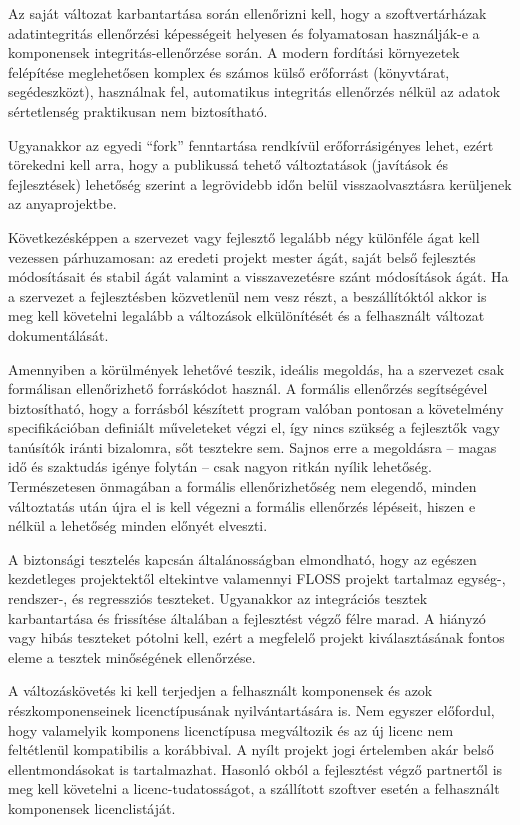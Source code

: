 \documentclass[12pt,magyar,a4paper,oneside]{scrreprt}
\begin{document}
Az saját változat karbantartása során ellenőrizni kell, hogy a
szoftvertárházak adatintegritás ellenőrzési képességeit helyesen és
folyamatosan használják-e a komponensek integritás-ellenőrzése során. A
modern fordítási környezetek felépítése meglehetősen komplex és számos
külső erőforrást (könyvtárat, segédeszközt), használnak fel, automatikus
integritás ellenőrzés nélkül az adatok sértetlenség praktikusan nem
biztosítható.

Ugyanakkor az egyedi ``fork'' fenntartása rendkívül erőforrásigényes
lehet, ezért törekedni kell arra, hogy a publikussá tehető változtatások
(javítások és fejlesztések) lehetőség szerint a legrövidebb időn belül
visszaolvasztásra kerüljenek az anyaprojektbe.

Következésképpen a szervezet vagy fejlesztő legalább négy különféle ágat
kell vezessen párhuzamosan: az eredeti projekt mester ágát, saját belső
fejlesztés módosításait és stabil ágát valamint a visszavezetésre szánt
módosítások ágát. Ha a szervezet a fejlesztésben közvetlenül nem vesz
részt, a beszállítóktól akkor is meg kell követelni legalább a
változások elkülönítését és a felhasznált változat dokumentálását.

Amennyiben a körülmények lehetővé teszik, ideális megoldás, ha a
szervezet csak formálisan ellenőrizhető forráskódot használ. A formális
ellenőrzés segítségével biztosítható, hogy a forrásból készített program
valóban pontosan a követelmény specifikációban definiált műveleteket
végzi el, így nincs szükség a fejlesztők vagy tanúsítók iránti
bizalomra, sőt tesztekre sem. Sajnos erre a megoldásra -- magas idő és
szaktudás igénye folytán -- csak nagyon ritkán nyílik lehetőség.
Természetesen önmagában a formális ellenőrizhetőség nem elegendő, minden
változtatás után újra el is kell végezni a formális ellenőrzés lépéseit,
hiszen e nélkül a lehetőség minden előnyét elveszti.

A biztonsági tesztelés kapcsán általánosságban elmondható, hogy az
egészen kezdetleges projektektől eltekintve valamennyi FLOSS projekt
tartalmaz egység-, rendszer-, és regressziós teszteket. Ugyanakkor az
integrációs tesztek karbantartása és frissítése általában a fejlesztést
végző félre marad. A hiányzó vagy hibás teszteket pótolni kell, ezért a
megfelelő projekt kiválasztásának fontos eleme a tesztek minőségének
ellenőrzése.

A változáskövetés ki kell terjedjen a felhasznált komponensek és azok
részkomponenseinek licenctípusának nyilvántartására is. Nem egyszer
előfordul, hogy valamelyik komponens licenctípusa megváltozik és az új
licenc nem feltétlenül kompatibilis a korábbival. A nyílt projekt jogi
értelemben akár belső ellentmondásokat is tartalmazhat. Hasonló okból a
fejlesztést végző partnertől is meg kell követelni a
licenc-tudatosságot, a szállított szoftver esetén a felhasznált
komponensek licenclistáját.
\end{document}

